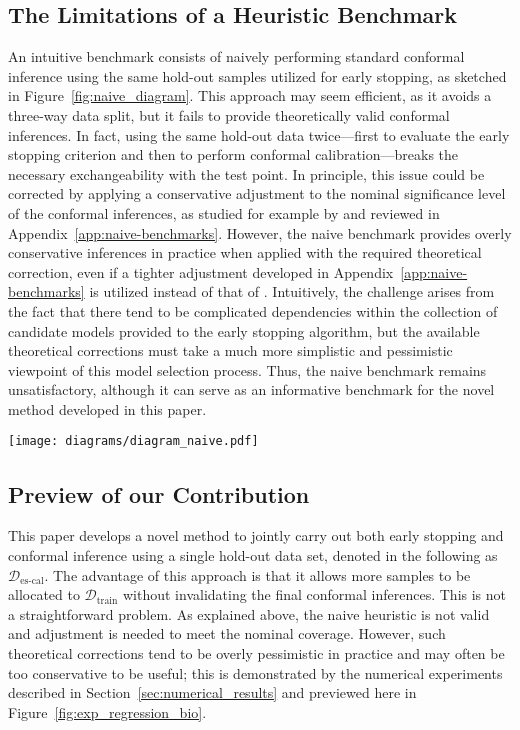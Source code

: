 \subsection{The Limitations of a Heuristic Benchmark}
\label{sec:naive_benchmark}

An intuitive benchmark consists of naively performing standard conformal inference using the same hold-out samples utilized for early stopping, as sketched in Figure~\ref{fig:naive_diagram}. 
This approach may seem efficient, as it avoids a three-way data split, but it fails to provide theoretically valid conformal inferences. In fact, using the same hold-out data twice---first to evaluate the early stopping criterion and then to perform conformal calibration---breaks the necessary exchangeability with the test point. 
In principle, this issue could be corrected by applying a conservative adjustment to the nominal significance level of the conformal inferences, as studied for example by \citet{efficiency_first_cp} and reviewed in Appendix~\ref{app:naive-benchmarks}. 
However, the naive benchmark provides overly conservative inferences in practice when applied with the required theoretical correction, even if a tighter adjustment developed in Appendix~\ref{app:naive-benchmarks} is utilized instead of that of \citet{efficiency_first_cp}.
Intuitively, the challenge arises from the fact that there tend to be complicated dependencies within the collection of candidate models provided to the early stopping algorithm, but the available theoretical corrections must take a much more simplistic and pessimistic viewpoint of this model selection process.
Thus, the naive benchmark remains unsatisfactory, although it can serve as an informative benchmark for the novel method developed in this paper.

\begin{figure*}[!htb]
  \centering
  \texttt{[image: diagrams/diagram\_naive.pdf]}
  \caption{Schematic visualization of heuristic conformal inferences based on a naive benchmark that utilizes the same hold-out data twice. }
  \label{fig:naive_diagram}
\end{figure*}

\subsection{Preview of our Contribution}

This paper develops a novel method to jointly carry out both early stopping and conformal inference using a single hold-out data set, denoted in the following as  $\mathcal{D}_{\text{es-cal}}$. The advantage of this approach is that it allows more samples to be allocated to  $\mathcal{D}_{\text{train}}$ without invalidating the final conformal inferences.
This is not a straightforward problem. As explained above, the naive heuristic is not valid and adjustment is needed to meet the nominal coverage.  
 However, such theoretical corrections tend to be overly pessimistic in practice and may often be too conservative to be useful; this is demonstrated by the numerical experiments described in Section~\ref{sec:numerical_results} and previewed here in Figure~\ref{fig:exp_regression_bio}.

